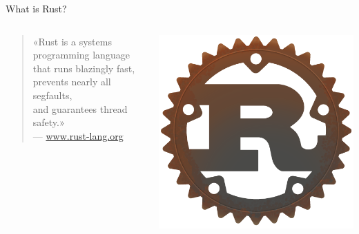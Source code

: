 \documentclass[aspectratio=1610,t]{beamer}
\begin{document}
\begin{frame}[c]{What is Rust?}
  \begin{columns}[onlytextwidth]
    \begin{column}{.8\textwidth}
      \begin{quote}
        «Rust is a systems programming language\\
        that runs blazingly fast, prevents nearly all segfaults,\\
        and guarantees thread safety.»\\
        \vspace{0.5em}
        {\normalfont \small --- \url{www.rust-lang.org}}
      \end{quote}
    \end{column}
    \begin{column}{.2\textwidth}
      \includegraphics[width=\textwidth]{./rust-logo-512x512.png}
    \end{column}
  \end{columns}
\end{frame}
\end{document}
